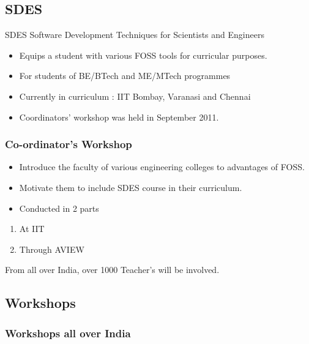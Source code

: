 \documentclass[compress,red]{beamer} %
\begin{document}
\subsection{SDES}
\begin{frame}
\begin{block}{SDES}
Software Development Techniques for Scientists and Engineers
\end{block}
\begin{itemize}
\item Equips a student with various FOSS tools for curricular purposes.
\item For students of BE/BTech and ME/MTech programmes
\item Currently in curriculum : IIT Bombay, Varanasi and Chennai
\item Coordinators' workshop was held in September 2011.
\end{itemize}
\end{frame}

\begin{frame}
\frametitle{Co-ordinator's Workshop}
\begin{itemize}
\item Introduce the faculty of various engineering colleges to advantages of FOSS. \pause
\item Motivate them to include SDES course in their curriculum. \pause
\item Conducted in 2 parts \pause
\end{itemize}
\begin{enumerate}
\item At IIT
\item Through AVIEW \pause
\end{enumerate}
\begin{block}
From all over India, over \alert{1000} Teacher's will be involved.
\end{block}
\end{frame}

\subsection{Workshops}
\begin{frame}
\frametitle{Workshops all over India}
\end{frame}
\end{document}
